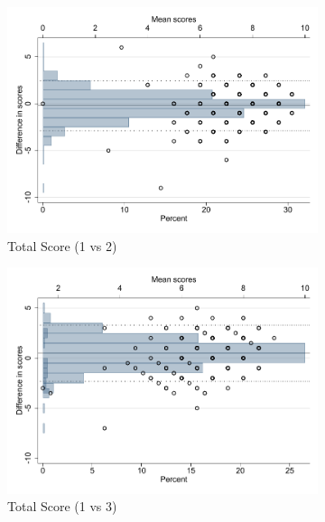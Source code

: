 \documentclass[oneside,11pt]{article}
\begin{document}
\begin{figure}[H] 
    \label{bland_altman}
    \caption{Bland-Altman plots}
     \begin{center}
      \begin{subfigure}{0.5\textwidth}
        \caption{Total Score (1 vs 2)}
        \centering
        \includegraphics[width=\textwidth]{Figuras/bland_altman_total_12.pdf}
    \end{subfigure}
    \begin{subfigure}{0.5\textwidth}
        \caption{Total Score (1 vs 3)}
        \centering
        \includegraphics[width=\textwidth]{Figuras/bland_altman_total_13.pdf}
    \end{subfigure}
    \begin{subfigure}{0.5\textwidth}

\end{subfigure}
\end{center}
\end{figure}
\end{document}
